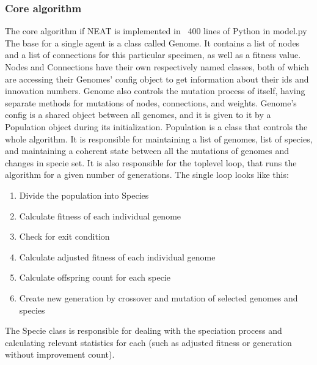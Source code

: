 \documentclass{article}
\begin{document}
        \subsubsection{Core algorithm}
        The core algorithm if NEAT is implemented in ~400 lines of Python in model.py
        The base for a single agent is a class called Genome. It contains a list of nodes and a list of connections for this particular 
        specimen, as well as a fitness value. Nodes and Connections have their own respectively named classes, both of which are accessing
        their Genomes' config object to get information about their ids and innovation numbers. Genome also controls the mutation process of itself,
        having separate methods for mutations of nodes, connections, and weights. Genome's config is a shared object between all genomes, and it is 
        given to it by a Population object during its initialization. Population is a class that controls the whole algorithm. It is responsible for
        maintaining a list of genomes, list of species, and maintaining a coherent state between all the mutations of genomes and changes in specie set.
        It is also responsible for the toplevel loop, that runs the algorithm for a given number of generations. The single loop looks like this:
        \begin{enumerate}
            \item Divide the population into Species
            \item Calculate fitness of each individual genome
            \item Check for exit condition
            \item Calculate adjusted fitness of each individual genome
            \item Calculate offspring count for each specie
            \item Create new generation by crossover and mutation of selected genomes and species
        \end{enumerate}
        The Specie class is responsible for dealing with the speciation process and calculating relevant statistics for each (such as adjusted fitness or 
        generation without improvement count). 
\end{document}
